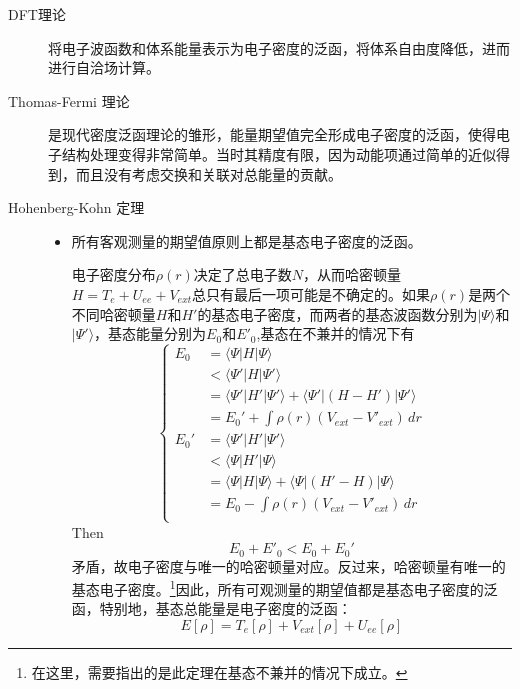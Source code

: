 \documentclass[12pt,a4paper,openany,twoside]{book}
\numberwithin{equation}{section}
\newcommand{\ket}[1]{| #1 \rangle}
\newcommand{\bracketl}[3]{\langle #1 | #2 | #3 \rangle}
\begin{document}
  \begin{description}
    \item[DFT理论]将电子波函数和体系能量表示为电子密度的泛函，将体系自由度降低，进而进行自洽场计算。
    
    \item[Thomas-Fermi 理论]
      是现代密度泛函理论的雏形，能量期望值完全形成电子密度的泛函，使得电子结构处理变得非常简单。当时其精度有限，因为动能项通过简单的近似得到，而且没有考虑交换和关联对总能量的贡献。
    \item[Hohenberg-Kohn 定理]
    \begin{itemize}
      \item 所有客观测量的期望值原则上都是基态电子密度的泛函。
  
      电子密度分布$\rho(r)$决定了总电子数$N$，从而哈密顿量$H=T_e+U_{ee}+V_{ext}$总只有最后一项可能是不确定的。如果$\rho(r)$是两个不同哈密顿量$H$和$H'$的基态电子密度，而两者的基态波函数分别为$\ket{\Psi}$和$\ket{\Psi'}$，基态能量分别为$E_0$和$E'_0$,基态在不兼并的情况下有
      \begin{equation}
      \begin{cases}
      E_0&=\bracketl{\Psi}{H}{\Psi}\\
      &<\bracketl{\Psi'}{H}{\Psi'}\\
      &=\bracketl{\Psi'}{H'}{\Psi'}+\bracketl{\Psi'}{(H-H')}{\Psi'}\\
      &=E_0'+\int \rho(r)(V_{ext}-V'_{ext})\,dr\\
      E_0'&=\bracketl{\Psi'}{H'}{\Psi'}\\&
      <\bracketl{\Psi}{H'}{\Psi}\\
      &=\bracketl{\Psi}{H}{\Psi}+\bracketl{\Psi}{(H'-H)}{\Psi}\\
      &=E_0-\int \rho(r)(V_{ext}-V'_{ext})\,dr\\
      \end{cases}
      \end{equation}
      Then
      \begin{equation}
      E_0+E'_0<E_0+E_0'
      \end{equation}
      矛盾，故电子密度与唯一的哈密顿量对应。反过来，哈密顿量有唯一的基态电子密度。\footnote{在这里，需要指出的是此定理在基态不兼并的情况下成立。}因此，所有可观测量的期望值都是基态电子密度的泛函，特别地，基态总能量是电子密度的泛函：
      \begin{equation}
      E[\rho]=T_e[\rho]+V_{ext}[\rho]+U_{ee}[\rho]
      \end{equation}
  

\end{itemize}
\end{description}
\end{document}
